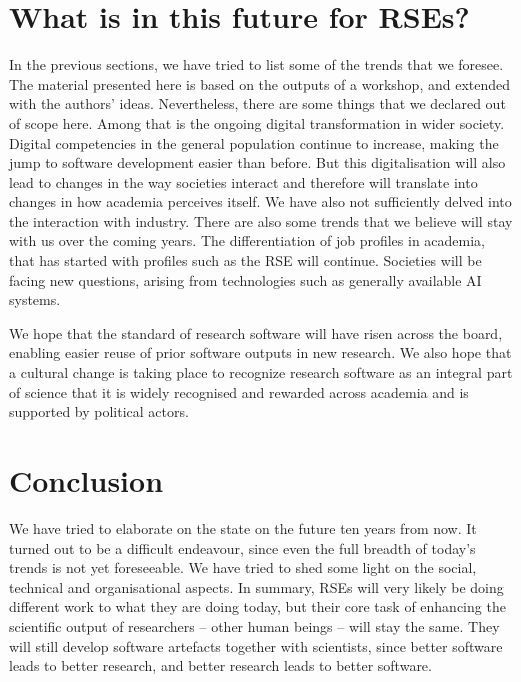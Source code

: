 \documentclass{eceasst}
\begin{document}
\section{What is in this future for RSEs?}
In the previous sections, we have tried to list some of the trends that we foresee.
The material presented here is based on the outputs of a workshop, and extended with the authors' ideas.
Nevertheless, there are some things that we declared out of scope here.
Among that is the ongoing digital transformation in wider society.
Digital competencies in the general population continue to increase,
making the jump to software development easier than before.
But this digitalisation will also lead to changes in the way societies
interact and therefore will translate into changes in how academia perceives itself.
We have also not sufficiently delved into the interaction with industry.
There are also some trends that we believe will stay with us over the coming years.
The differentiation of job profiles in academia, that has started with profiles such as the RSE will continue.
Societies will be facing new questions, arising from technologies such as generally available AI systems.

We hope that the standard of research software will have risen across the board,
enabling easier reuse of prior software outputs in new research.
We also hope that a cultural change is taking place to recognize research software
as an integral part of science that it is widely recognised and rewarded across
academia and is supported by political actors.
\section{Conclusion}
We have tried to elaborate on the state on the future ten years from now.
It turned out to be a difficult endeavour, since even the full breadth of today's trends is not yet foreseeable.
We have tried to shed some light on the social, technical and organisational aspects.
In summary, RSEs will very likely be doing different work to what they are doing today,
but their core task of enhancing the scientific output of researchers -- other human
beings -- will stay the same.
They will still develop software artefacts together with scientists,
since better software leads to better research,
and better research leads to better software.
\end{document}
